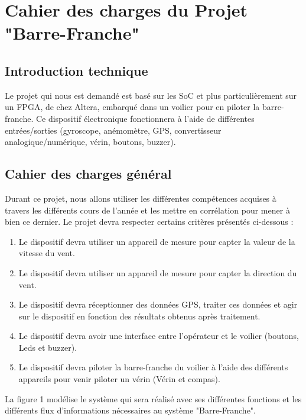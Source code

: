 \section{Cahier des charges du Projet "Barre-Franche"}
\subsection{Introduction technique}
Le projet qui nous est demandé est basé sur les SoC et plus particulièrement sur un FPGA, de chez Altera, embarqué dans un voilier pour en piloter la barre-franche.
\newline
Ce dispositif électronique fonctionnera à l'aide de différentes entrées/sorties (gyroscope, anémomètre, GPS, convertisseur analogique/numérique, vérin, boutons, buzzer).
\subsection{Cahier des charges général}
Durant ce projet, nous allons utiliser les différentes compétences acquises à travers les différents cours de l'année et les mettre en corrélation pour mener à bien ce dernier. Le projet devra respecter certains critères présentés ci-dessous :
\begin{enumerate}
    \item   Le dispositif devra utiliser un appareil de mesure pour capter la valeur de la vitesse du vent.
    \item   Le dispositif devra utiliser un appareil de mesure pour capter la direction du vent.
    \item   Le dispositif devra réceptionner des données GPS, traiter ces données et agir sur le dispositif en fonction des résultats obtenus après traitement.
    \item   Le dispositif devra avoir une interface entre l'opérateur et le voilier (boutons, Leds et buzzer).
    \item   Le dispositif devra piloter la barre-franche du voilier à l'aide des différents appareils pour venir piloter un vérin (Vérin et compas). 
\end{enumerate}\vspace{1cm}
La figure 1 modélise le système qui sera réalisé avec ses différentes fonctions et les différents flux d'informations nécessaires au système "Barre-Franche".
